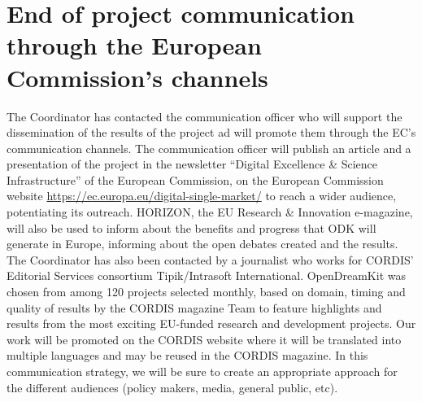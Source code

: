 \documentclass{deliverablereport}
\begin{document}


\section{End of project communication through the European Commission's channels}

The Coordinator has contacted the communication officer  who will support the dissemination
of the results of the project ad will promote them through the EC's communication channels. 
The communication officer will publish an article and a presentation of the project in the 
newsletter “Digital Excellence \& Science Infrastructure” of the European Commission, 
on the European Commission website \url{https://ec.europa.eu/digital-single-market/} to reach 
a wider audience, potentiating its outreach. 
HORIZON, the EU Research \& Innovation e-magazine, will also be used to inform about 
the benefits and progress that ODK will generate in Europe, informing about 
the open debates created and the results.
The Coordinator has also been contacted by a journalist who works for CORDIS' Editorial
 Services consortium Tipik/Intrasoft International. OpenDreamKit was chosen from among 120
projects selected monthly, based on domain, timing and quality of results by the CORDIS magazine Team
to feature highlights and results from the most exciting EU-funded research and development projects.
Our work will be promoted on the CORDIS website where it will be translated into multiple
languages and may be reused in the CORDIS magazine. In this communication strategy, we will
be sure to create an appropriate approach for the different audiences (policy makers, media,
general public, etc).

\clearpage
\appendix

\clearpage

\end{document}
